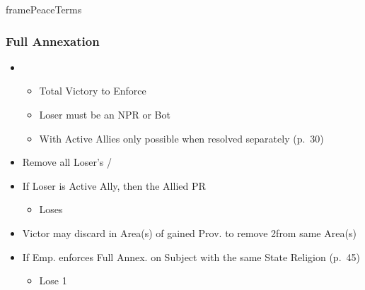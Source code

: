 \documentclass[10pt]{article}
\begin{document}
\begin{dynamiccontents*}{framePeaceTerms}
\begin{multicols}{3}
		\subsubsection*{Full Annexation}
		\begin{itemize}
			\item {}
			\begin{itemize}
				\item Total Victory to Enforce
				\item Loser must be an NPR or Bot
				\item With Active Allies only possible when resolved separately (p.~30)
			\end{itemize}
			\item Remove all Loser's \alliances/\marriages
			\item If Loser is Active Ally, then the Allied PR
			\begin{itemize}
				\item Loses 
			\end{itemize}
			\item Victor may discard \claims in Area(s) of gained Prov. to remove 2\unrest from same Area(s)
			\item If Emp. enforces Full Annex. on Subject with the same State Religion (p.~45)
			\begin{itemize}
				\item Lose 1\authority
			\end{itemize}
		\end{itemize}


\end{multicols}
\end{dynamiccontents*}
\end{document}
